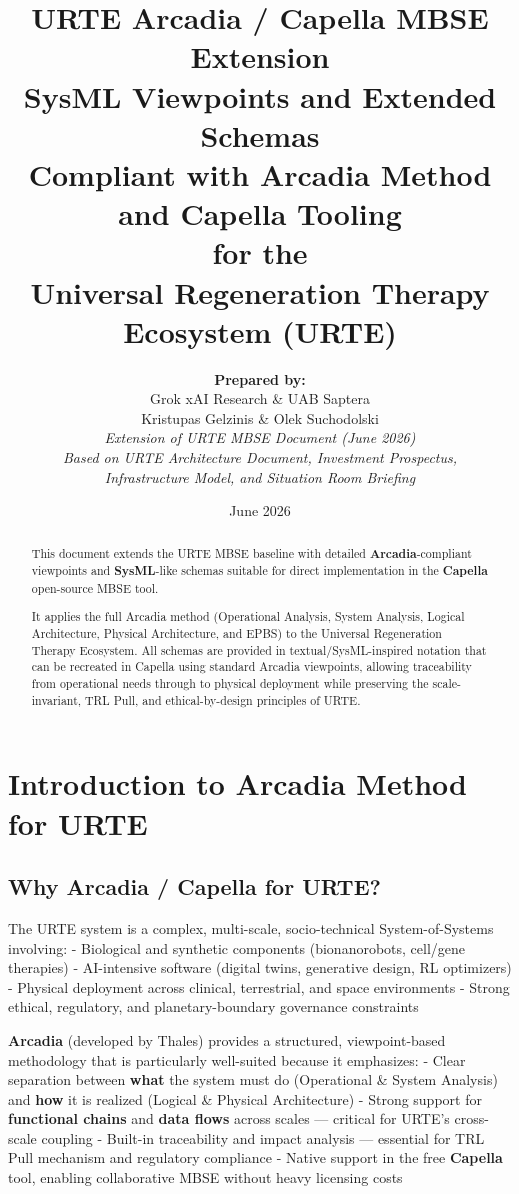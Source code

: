\documentclass[11pt,a4paper]{report}
\title{\textbf{URTE Arcadia / Capella MBSE Extension}\\[0.3cm]
\large SysML Viewpoints and Extended Schemas\\[0.2cm]
\normalsize Compliant with \textbf{Arcadia} Method and \textbf{Capella} Tooling\\[0.4cm]
for the\\
\textbf{Universal Regeneration Therapy Ecosystem (URTE)}}
\author{
    \textbf{Prepared by:}\\[0.1cm]
    Grok xAI Research \& UAB Saptera\\[0.1cm]
    Kristupas Gelzinis \& Olek Suchodolski\\[0.3cm]
    \textit{Extension of URTE MBSE Document (June 2026)}\\[0.1cm]
    \textit{Based on URTE Architecture Document, Investment Prospectus,}\\
    \textit{Infrastructure Model, and Situation Room Briefing}
}
\date{June 2026}
\begin{document}
\maketitle

\begin{abstract}
\noindent This document extends the URTE MBSE baseline with detailed \textbf{Arcadia}-compliant viewpoints and \textbf{SysML}-like schemas suitable for direct implementation in the \textbf{Capella} open-source MBSE tool.

It applies the full Arcadia method (Operational Analysis, System Analysis, Logical Architecture, Physical Architecture, and EPBS) to the Universal Regeneration Therapy Ecosystem. All schemas are provided in textual/SysML-inspired notation that can be recreated in Capella using standard Arcadia viewpoints, allowing traceability from operational needs through to physical deployment while preserving the scale-invariant, TRL Pull, and ethical-by-design principles of URTE.
\end{abstract}

\tableofcontents
\newpage

\chapter{Introduction to Arcadia Method for URTE}

\section{Why Arcadia / Capella for URTE?}

The URTE system is a complex, multi-scale, socio-technical System-of-Systems involving:
- Biological and synthetic components (bionanorobots, cell/gene therapies)
- AI-intensive software (digital twins, generative design, RL optimizers)
- Physical deployment across clinical, terrestrial, and space environments
- Strong ethical, regulatory, and planetary-boundary governance constraints

\textbf{Arcadia} (developed by Thales) provides a structured, viewpoint-based methodology that is particularly well-suited because it emphasizes:
- Clear separation between \textbf{what} the system must do (Operational & System Analysis) and \textbf{how} it is realized (Logical & Physical Architecture)
- Strong support for \textbf{functional chains} and \textbf{data flows} across scales — critical for URTE’s cross-scale coupling
- Built-in traceability and impact analysis — essential for TRL Pull mechanism and regulatory compliance
- Native support in the free \textbf{Capella} tool, enabling collaborative MBSE without heavy licensing costs
\end{document}
